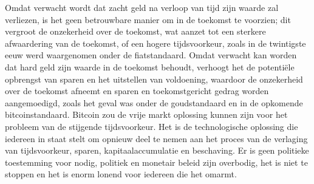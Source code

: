 Omdat verwacht wordt dat zacht geld na verloop van tijd zijn waarde zal verliezen, is het geen betrouwbare manier om in de toekomst te voorzien; dit vergroot de onzekerheid over de toekomst, wat aanzet tot een sterkere afwaardering van de toekomst, of een hogere tijdsvoorkeur, zoals in de twintigste eeuw werd waargenomen onder de fiatstandaard. Omdat verwacht kan worden dat hard geld zijn waarde in de toekomst behoudt, verhoogt het de potentiële opbrengst van sparen en het uitstellen van voldoening, waardoor de onzekerheid over de toekomst afneemt en sparen en toekomstgericht gedrag worden aangemoedigd, zoals het geval was onder de goudstandaard en in de opkomende bitcoinstandaard. Bitcoin zou de vrije markt oplossing kunnen zijn voor het probleem van de stijgende tijdsvoorkeur. Het is de technologische oplossing die iedereen in staat stelt om opnieuw deel te nemen aan het proces van de verlaging van tijdsvoorkeur, sparen, kapitaalaccumulatie en beschaving. Er is geen politieke toestemming voor nodig, politiek en monetair beleid zijn overbodig, het is niet te stoppen en het is enorm lonend voor iedereen die het omarmt.
